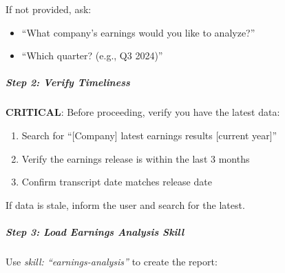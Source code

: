 \documentclass[11pt]{article}
\begin{document}
If not provided, ask:

\begin{itemize}[leftmargin=*,itemsep=2pt,topsep=2pt]
\item {} ``What company's earnings would you like to analyze?''
\item {} ``Which quarter? (e.g., Q3 2024)''
\end{itemize}

\subparagraph{Step 2: Verify Timeliness}\mbox{}\par

\textbf{CRITICAL}: Before proceeding, verify you have the latest data:

\begin{enumerate}[leftmargin=*,itemsep=2pt,topsep=2pt]
\item {} Search for ``[Company] latest earnings results [current year]''
\item {} Verify the earnings release is within the last 3 months
\item {} Confirm transcript date matches release date
\end{enumerate}

If data is stale, inform the user and search for the latest.


\subparagraph{Step 3: Load Earnings Analysis Skill}\mbox{}\par

Use \emph{skill: ``earnings-analysis''} to create the report:
\end{document}
